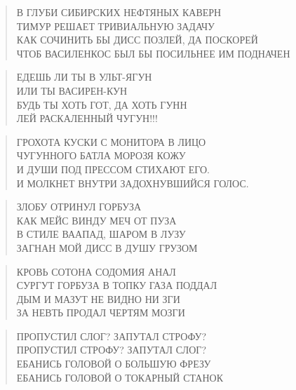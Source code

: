 \poemtitle{***}
\begin{verse}
В ГЛУБИ СИБИРСКИХ НЕФТЯНЫХ КАВЕРН\\
ТИМУР РЕШАЕТ ТРИВИАЛЬНУЮ ЗАДАЧУ\\
КАК СОЧИНИТЬ БЫ ДИСС ПОЗЛЕЙ, ДА ПОСКОРЕЙ\\
ЧТОБ ВАСИЛЕНКОС БЫЛ БЫ ПОСИЛЬНЕЕ ИМ ПОДНАЧЕН
\end{verse}

\poemtitle{***}
\begin{verse}
ЕДЕШЬ ЛИ ТЫ В УЛЬТ-ЯГУН\\
ИЛИ ТЫ ВАСИРЕН-КУН\\
БУДЬ ТЫ ХОТЬ ГОТ, ДА ХОТЬ ГУНН\\
ЛЕЙ РАСКАЛЕННЫЙ ЧУГУН!!!
\end{verse}

\poemtitle{***}
\begin{verse}
ГРОХОТА КУСКИ С МОНИТОРА В ЛИЦО\\
ЧУГУННОГО БАТЛА МОРОЗЯ КОЖУ\\
И ДУШИ ПОД ПРЕССОМ СТИХАЮТ ЕГО.\\
И МОЛКНЕТ ВНУТРИ ЗАДОХНУВШИЙСЯ ГОЛОС.
\end{verse}

\poemtitle{***}
\begin{verse}
ЗЛОБУ ОТРИНУЛ ГОРБУЗА\\
КАК МЕЙС ВИНДУ МЕЧ ОТ ПУЗА\\
В СТИЛЕ ВААПАД, ШАРОМ В ЛУЗУ\\
ЗАГНАН МОЙ ДИСС В ДУШУ ГРУЗОМ
\end{verse}

\poemtitle{***}
\begin{verse}
КРОВЬ СОТОНА СОДОМИЯ АНАЛ\\
СУРГУТ ГОРБУЗА В ТОПКУ ГАЗА ПОДДАЛ\\
ДЫМ И МАЗУТ НЕ ВИДНО НИ ЗГИ\\
ЗА НЕВТЬ ПРОДАЛ ЧЕРТЯМ МОЗГИ
\end{verse}

\poemtitle{***}
\begin{verse}
ПРОПУСТИЛ СЛОГ? ЗАПУТАЛ СТРОФУ?\\
ПРОПУСТИЛ СТРОФУ? ЗАПУТАЛ СЛОГ?\\
ЕБАНИСЬ ГОЛОВОЙ О БОЛЬШУЮ ФРЕЗУ\\
ЕБАНИСЬ ГОЛОВОЙ О ТОКАРНЫЙ СТАНОК
\end{verse}

